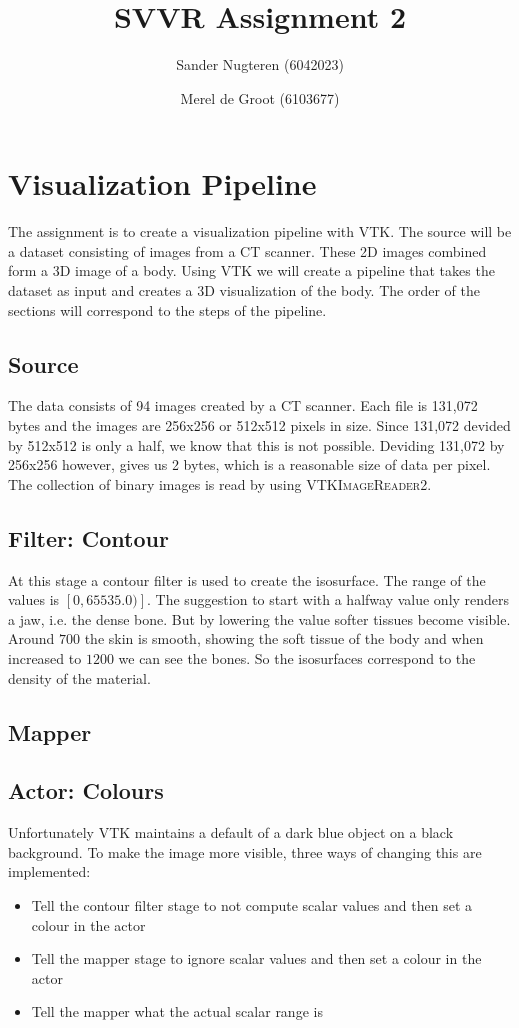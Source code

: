 \documentclass{article}
\begin{document}
\title{SVVR Assignment 2}
\author{Sander Nugteren (6042023) \and Merel de Groot (6103677)}
\renewcommand{\today}{November 17, 2014}
\maketitle

\section{Visualization Pipeline}
The assignment is to create a visualization pipeline with VTK. The source will be a dataset consisting of images from a CT scanner. These 2D images combined form a 3D image of a body. Using VTK we will create a pipeline that takes the dataset as input and creates a 3D visualization of the body. The order of the sections will correspond to the steps of the pipeline.

\subsection{Source}
The data consists of 94 images created by a CT scanner. Each file is 131,072 bytes and the images are 256x256 or 512x512 pixels in size. Since 131,072 devided by 512x512 is only a half, we know that this is not possible. Deviding 131,072 by 256x256 however, gives us 2 bytes, which is a reasonable size of data per pixel. The collection of binary images is read by using \textsc{VTKImageReader2}.

\subsection{Filter: Contour}
At this stage a contour filter is used to create the isosurface. The range of the values is $\left[ 0,  65535.0) \right]$. The suggestion to start with a halfway value only renders a jaw, i.e. the dense bone. But by lowering the value softer tissues become visible. Around $700$ the skin is smooth, showing the soft tissue of the body and when increased to $1200$ we can see the bones. So the isosurfaces correspond to the density of the material.

\subsection{Mapper}



\subsection{Actor: Colours}
Unfortunately VTK maintains a default of a dark blue object on a black background. To make the image more visible, three ways of changing this are implemented:
\begin{itemize}
\item Tell the contour filter stage to not compute scalar values and then set a colour in the actor
\item Tell the mapper stage to ignore scalar values and then set a colour in the actor
\item Tell the mapper what the actual scalar range is
\end{itemize}
\end{document}
